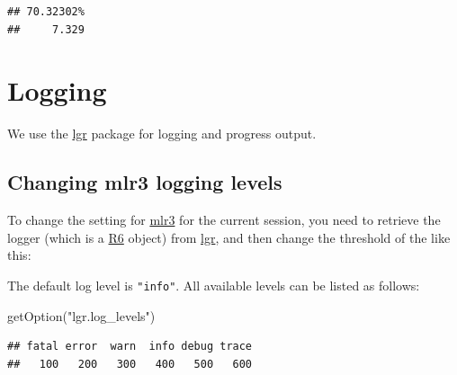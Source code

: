 \documentclass[
]{scrbook}
\newenvironment{Shaded}{\begin{snugshade}}{\end{snugshade}}
\newcommand{\FunctionTok}[1]{\textcolor[rgb]{0.00,0.00,0.00}{#1}}
\newcommand{\NormalTok}[1]{#1}
\newcommand{\OtherTok}[1]{\textcolor[rgb]{0.56,0.35,0.01}{#1}}
\newcommand{\SpecialCharTok}[1]{\textcolor[rgb]{0.00,0.00,0.00}{#1}}
\newcommand{\StringTok}[1]{\textcolor[rgb]{0.31,0.60,0.02}{#1}}
\renewenvironment{Shaded} {\begin{snugshade}\small} {\end{snugshade}}
\begin{document}
\begin{verbatim}
## 70.32302% 
##     7.329
\end{verbatim}

\hypertarget{logging}{%
\section{Logging}\label{logging}}

We use the \href{https://cran.r-project.org/package=lgr}{lgr} package for logging and progress output.

\hypertarget{changing-mlr3-logging-levels}{%
\subsection{Changing mlr3 logging levels}\label{changing-mlr3-logging-levels}}

To change the setting for \href{https://mlr3.mlr-org.com}{mlr3} for the current session, you need to retrieve the logger (which is a \href{https://cran.r-project.org/package=R6}{R6} object) from \href{https://cran.r-project.org/package=lgr}{lgr}, and then change the threshold of the like this:

\begin{Shaded}
\end{Shaded}

The default log level is \texttt{"info"}.
All available levels can be listed as follows:

\begin{Shaded}
\begin{Highlighting}[]
\FunctionTok{getOption}\NormalTok{(}\StringTok{"lgr.log\_levels"}\NormalTok{)}
\end{Highlighting}
\end{Shaded}

\begin{verbatim}
## fatal error  warn  info debug trace 
##   100   200   300   400   500   600
\end{verbatim}
\end{document}
